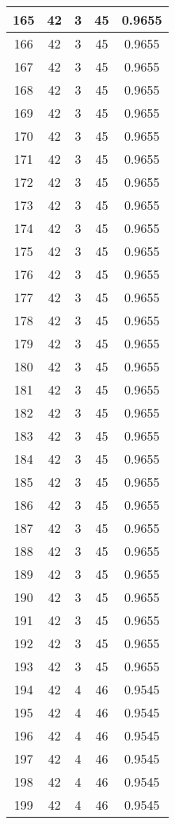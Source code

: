 \documentclass[letterpaper, 12pt]{article}
\begin{document}
\begin{longtable}{|c|c|c|c|c|}
\hline
165 & 42 & 3 & 45 & 0.9655 \\
\hline
166 & 42 & 3 & 45 & 0.9655 \\
\hline
167 & 42 & 3 & 45 & 0.9655 \\
\hline
168 & 42 & 3 & 45 & 0.9655 \\
\hline
169 & 42 & 3 & 45 & 0.9655 \\
\hline
170 & 42 & 3 & 45 & 0.9655 \\
\hline
171 & 42 & 3 & 45 & 0.9655 \\
\hline
172 & 42 & 3 & 45 & 0.9655 \\
\hline
173 & 42 & 3 & 45 & 0.9655 \\
\hline
174 & 42 & 3 & 45 & 0.9655 \\
\hline
175 & 42 & 3 & 45 & 0.9655 \\
\hline
176 & 42 & 3 & 45 & 0.9655 \\
\hline
177 & 42 & 3 & 45 & 0.9655 \\
\hline
178 & 42 & 3 & 45 & 0.9655 \\
\hline
179 & 42 & 3 & 45 & 0.9655 \\
\hline
180 & 42 & 3 & 45 & 0.9655 \\
\hline
181 & 42 & 3 & 45 & 0.9655 \\
\hline
182 & 42 & 3 & 45 & 0.9655 \\
\hline
183 & 42 & 3 & 45 & 0.9655 \\
\hline
184 & 42 & 3 & 45 & 0.9655 \\
\hline
185 & 42 & 3 & 45 & 0.9655 \\
\hline
186 & 42 & 3 & 45 & 0.9655 \\
\hline
187 & 42 & 3 & 45 & 0.9655 \\
\hline
188 & 42 & 3 & 45 & 0.9655 \\
\hline
189 & 42 & 3 & 45 & 0.9655 \\
\hline
190 & 42 & 3 & 45 & 0.9655 \\
\hline
191 & 42 & 3 & 45 & 0.9655 \\
\hline
192 & 42 & 3 & 45 & 0.9655 \\
\hline
193 & 42 & 3 & 45 & 0.9655 \\
\hline
194 & 42 & 4 & 46 & 0.9545 \\
\hline
195 & 42 & 4 & 46 & 0.9545 \\
\hline
196 & 42 & 4 & 46 & 0.9545 \\
\hline
197 & 42 & 4 & 46 & 0.9545 \\
\hline
198 & 42 & 4 & 46 & 0.9545 \\
\hline
199 & 42 & 4 & 46 & 0.9545 \\
\hline
\end{longtable}
\end{document}
